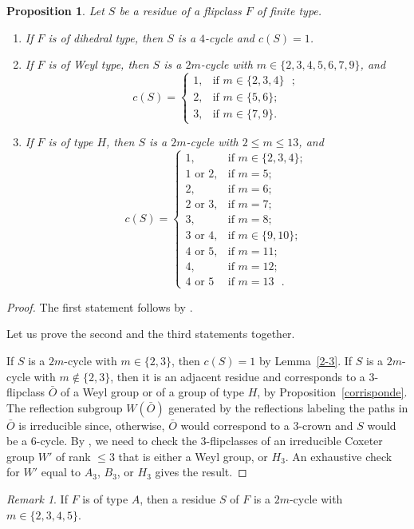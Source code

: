 \documentclass[12pt,reqno]{amsart}
\theoremstyle{plain}
\newtheorem{pro}[thm]{Proposition}
\theoremstyle{definition}
\theoremstyle{remark}
\newtheorem{rmk}[thm]{Remark}
\begin{document}
\begin{pro}
\label{2,3,4,5,6,7,9}
Let $S$ be a residue of a flipclass $F$ of finite type.
\begin{enumerate}

\item If $F$ is of dihedral type, then $S$ is a $4$-cycle and $c(S)=1$.

\item If $F$ is of Weyl type,  then $S$ is a $2m$-cycle with
$
m\in\{2,3,4,5,6,7,9\}
$,
and 
$$ c(S)= \left\{ \begin{array}{ll}
1, & \mbox{if $m\in\{2,3,4\}$ }; \\
2, & \mbox{if $m\in\{5,6\}$}; \\
3, & \mbox{if $m\in\{7,9\}$}. 
\end{array} \right. $$

\item If $F$ is of type $H$, then $S$ is a $2m$-cycle with  $2\leq m \leq 13$, and 
$$ c(S)= \left\{ \begin{array}{ll}
1, & \mbox{if $m\in\{2,3,4\}$}; \\
1 \text{ or } 2, & \mbox{if $m =5$}; \\
2, &  \mbox{if $m = 6$; } \\
2 \text{ or } 3, & \mbox{if $m=7$};\\
3, & \mbox{if $m =8$}; \\
3 \text{ or } 4, &  \mbox{if $m \in \{ 9,10\}$}; \\
4 \text{ or } 5, & \mbox{if $m=11$};\\
4, & \mbox{if $m =12$}; \\
4 \text{ or } 5 &  \mbox{if $m = 13$ }. 
\end{array} \right. $$
\end{enumerate}
\end{pro}
\begin{proof}
The first statement follows by  \cite[Section~4]{EMS}.


Let us prove the second and the third statements together.


If $S$ is a $2m$-cycle with $m\in \{2,3\}$, then $c(S)=1$ by Lemma~\ref{2-3}.
If $S$ is a $2m$-cycle with $m\notin \{2,3\}$, then it is an adjacent residue and corresponds to a $3$-flipclass $\bar{O}$ of a Weyl group or of a group of type $H$, by Proposition~\ref{corrisponde}.
The reflection subgroup $W(\bar{O})$ generated by the reflections labeling the paths in $\bar{O}$ is irreducible since, otherwise,  $\bar{O}$ would correspond to a $3$-crown and $S$ would be a $6$-cycle. 
By \cite[Theorem~6.10]{EMS}, we need to check the 3-flipclasses of an irreducible  Coxeter group $W'$ of rank $ \leq 3$ that is either a Weyl group,  or  $H_3$. 
An exhaustive check for  $W'$ equal to  $A_3$,   $B_3$, or  $H_3$ gives the result. 
\end{proof}
\begin{rmk}
 If $F$ is of type $A$, then a residue $S$ of $F$ is a $2m$-cycle with
$
m\in\{2,3,4,5\}$.

\end{rmk}
\end{document}
